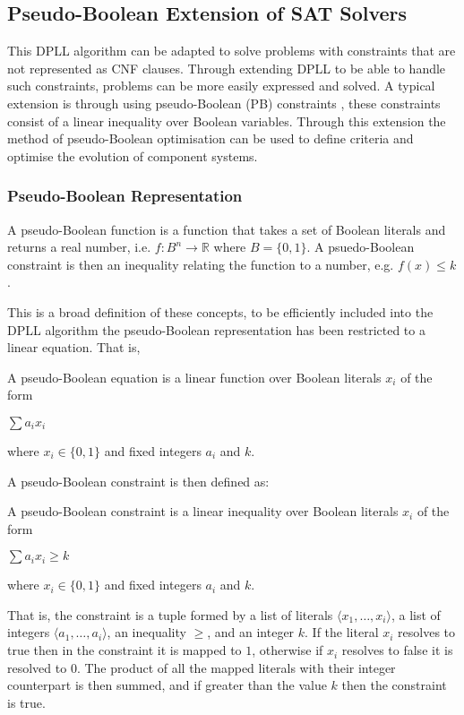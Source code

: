 \subsection{Pseudo-Boolean Extension of SAT Solvers}
This DPLL algorithm can be adapted to solve problems with constraints that are not represented as CNF clauses.
Through extending DPLL to be able to handle such constraints, problems can be more easily expressed and solved.
A typical extension is through using pseudo-Boolean (PB) constraints \citep{dixon2004automating}, these constraints consist of a linear inequality over Boolean variables.
Through this extension the method of pseudo-Boolean optimisation can be used to define criteria and optimise the evolution of component systems.

\subsubsection{Pseudo-Boolean Representation}
A pseudo-Boolean function is a function that takes a set of Boolean literals and returns a real number, i.e. $f:B^n \rightarrow \mathbb{R}$ where $B = \{0,1\}$.
A psuedo-Boolean constraint is then an inequality relating the function to a number, e.g. $f(x) \leq k$.

This is a broad definition of these concepts, to be efficiently included into the DPLL algorithm the pseudo-Boolean representation has been restricted to a linear equation.
That is,
\begin{defs}
A pseudo-Boolean equation is a linear function over Boolean literals $x_i$ of the form

$\sum a_i x_i$

where $x_i \in \{0,1\}$ and fixed integers $a_i$ and $k$.
\end{defs}

A pseudo-Boolean constraint is then defined as:
\begin{defs}
A pseudo-Boolean constraint is a linear inequality over Boolean literals $x_i$ of the form

$\sum a_i x_i \geq k$

where $x_i \in \{0,1\}$ and fixed integers $a_i$ and $k$.
\end{defs}


That is, the constraint is a tuple formed by a list of literals $\langle x_1,\ldots,x_i \rangle$, a list of integers $\langle a_1,\ldots,a_i \rangle$, an inequality $\geq$, and an integer $k$.
If the literal $x_i$ resolves to true then in the constraint it is mapped to $1$, otherwise  if $x_i$ resolves to false it is resolved to $0$.
The product of all the mapped literals with their integer counterpart is then summed, and if greater than the value $k$ then the constraint is true. 

